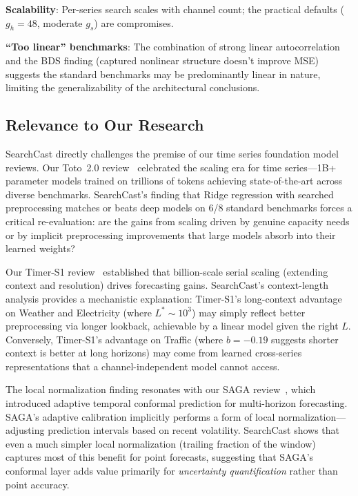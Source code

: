 \documentclass[11pt,a4paper]{article}
\begin{document}
\textbf{Scalability}: Per-series search scales with channel count; the practical defaults ($g_h = 48$, moderate $g_s$) are compromises.

\textbf{``Too linear'' benchmarks}: The combination of strong linear autocorrelation and the BDS finding (captured nonlinear structure doesn't improve MSE) suggests the standard benchmarks may be predominantly linear in nature, limiting the generalizability of the architectural conclusions.

\subsection{Relevance to Our Research}

SearchCast directly challenges the premise of our time series foundation model reviews. Our Toto~2.0 review~\cite{woo2026toto} celebrated the scaling era for time series---1B+ parameter models trained on trillions of tokens achieving state-of-the-art across diverse benchmarks. SearchCast's finding that Ridge regression with searched preprocessing matches or beats deep models on 6/8 standard benchmarks forces a critical re-evaluation: are the gains from scaling driven by genuine capacity needs or by implicit preprocessing improvements that large models absorb into their learned weights?

Our Timer-S1 review~\cite{liu2026timers1} established that billion-scale serial scaling (extending context and resolution) drives forecasting gains. SearchCast's context-length analysis provides a mechanistic explanation: Timer-S1's long-context advantage on Weather and Electricity (where $L^* \sim 10^3$) may simply reflect better preprocessing via longer lookback, achievable by a linear model given the right $L$. Conversely, Timer-S1's advantage on Traffic (where $b = -0.19$ suggests shorter context is better at long horizons) may come from learned cross-series representations that a channel-independent model cannot access.

The local normalization finding resonates with our SAGA review~\cite{saga2026}, which introduced adaptive temporal conformal prediction for multi-horizon forecasting. SAGA's adaptive calibration implicitly performs a form of local normalization---adjusting prediction intervals based on recent volatility. SearchCast shows that even a much simpler local normalization (trailing fraction of the window) captures most of this benefit for point forecasts, suggesting that SAGA's conformal layer adds value primarily for \emph{uncertainty quantification} rather than point accuracy.
\end{document}
